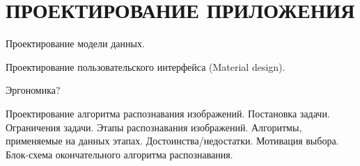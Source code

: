 \section[Проектирование приложения]{%
  ПРОЕКТИРОВАНИЕ ПРИЛОЖЕНИЯ
}

\label{sec:design}

Проектирование модели данных.

Проектирование пользовательского интерфейса (Material design).

Эргономика?

Проектирование алгоритма распознавания изображений.
Постановка задачи. Ограничения задачи.
Этапы распознавания изображений. Алгоритмы, применяемые на данных этапах.
Достоинства/недостатки. Мотивация выбора.
Блок-схема окончательного алгоритма распознавания.

